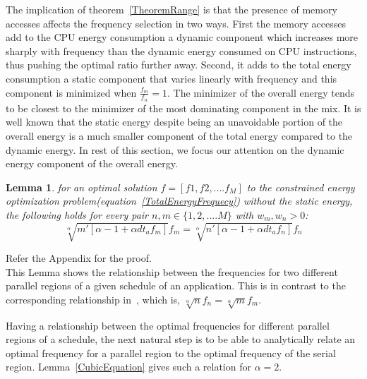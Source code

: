\documentclass[11pt, letterpaper]{article}
\newtheorem{lemma}{Lemma}
\begin{document}
The implication of theorem~\ref{TheoremRange} is that the presence of memory accesses affects the frequency selection in two ways. First the memory accesses add to the CPU energy consumption a dynamic component which increases more sharply with frequency than the dynamic energy consumed on CPU instructions, thus pushing the optimal ratio further away. Second, it adds to the total energy consumption a static component that varies linearly with frequency and this component is minimized when $\frac{f_m}{f_n} = 1$. The minimizer of the overall energy tends to be closest to the minimizer of the most dominating component in the mix. It is well known that the static energy despite being an unavoidable portion of the overall energy is a much smaller component of the total energy compared to the dynamic energy.
In rest of this section, we focus our attention on the dynamic energy component of the overall energy.

\begin{lemma}\label{Relation}
for an optimal solution $f=[f1,f2,....f_M]$ to the constrained energy optimization problem(equation~\ref{TotalEnergyFrequecy}) without the static energy, the following holds for every pair $n,m \in \{1,2,....M\}$ with $w_m,w_n>0$:\\
 \begin{displaymath}
  \sqrt[\alpha]{m'[\alpha -1 + \alpha dt_af_m]}f_m =  \sqrt[\alpha]{n'[\alpha -1 + \alpha dt_af_n]}f_n
 \end{displaymath}
\end{lemma}
 Refer the Appendix for the proof. \\
This Lemma shows the relationship between the frequencies for two different parallel regions of a given schedule of an application. This is in contrast to the corresponding relationship in~\cite{ConvexAndScheduling}, which is, $\sqrt[\alpha]{n}f_n = \sqrt[\alpha]{m}f_m$. 


Having a relationship between the optimal frequencies for different parallel regions of a schedule, the next natural step is to be able to analytically relate an optimal frequency for a parallel region to the optimal frequency of the serial region.  Lemma~\ref{CubicEquation} gives such a relation for $\alpha=2$. 
\end{document}

